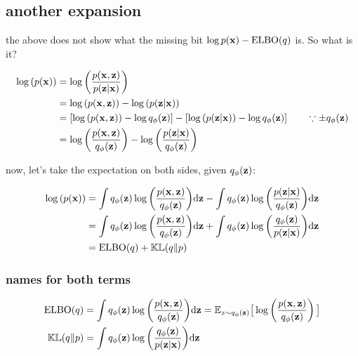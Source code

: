 \documentclass{article}
\begin{document}
\subsection{another expansion}

the above does not show what the missing bit $\log p({\mathbf x}) - \text{ELBO}(q)$ is. So what is it?

\begin{equation}\begin{split}
\log{(p({\mathbf x}))} &=  \log{  \left( \frac{p({\mathbf x},{\mathbf z})}{p({\mathbf z}|{\mathbf x})} \right)  } \\
&=  \log{ (p({\mathbf x},{\mathbf z})) } - \log{ (p({\mathbf z}|{\mathbf x})) }\\
&=  [ \log{ (p({\mathbf x},{\mathbf z})) } - \log q_\phi({\mathbf z})] - [ \log{ (p({\mathbf z}|{\mathbf x})) } - \log q_\phi({\mathbf z})] \quad\quad \because \pm q_\phi({\mathbf z})\\
&=  \log{  \left(   \frac{p({\mathbf x},{\mathbf z})}{q_\phi({\mathbf z})}  \right)  } -  \log{  \left(   \frac{p({\mathbf z}|{\mathbf x})}{q_\phi({\mathbf z})}  \right)  }\\
\end{split}\end{equation}


now, let's take the expectation on both sides, given $q_\phi({\mathbf z})$:



\begin{equation}\begin{split}
\log{(p({\mathbf x}))} &=   \int q_\phi({\mathbf z}) \log{  \left(   \frac{p({\mathbf x},{\mathbf z})}{q_\phi({\mathbf z})}  \right)  } \text{d} {\mathbf z} -  \int q_\phi({\mathbf z}) \log{  \left(   \frac{p({\mathbf z}|{\mathbf x})}{q_\phi({\mathbf z})}  \right)  } \text{d} {\mathbf z}\\
&=   \int q_\phi({\mathbf z}) \log{  \left(   \frac{p({\mathbf x},{\mathbf z})}{q_\phi({\mathbf z})}  \right)  } \text{d} {\mathbf z} + \int q_\phi({\mathbf z}) \log{  \left(   \frac{q_\phi({\mathbf z})}{p({\mathbf z}|{\mathbf x})}  \right)  } \text{d} {\mathbf z}\\
&= \text{ELBO}(q) + \mathbb{KL}(q\|p)
\end{split}\end{equation}



\subsubsection{names for both terms}

\begin{equation}\begin{split}
\text{ELBO}(q) &= \int q_\phi({\mathbf z}) \log{  \left(   \frac{p({\mathbf x},{\mathbf z})}{q_\phi({\mathbf z})}  \right)  } \text{d} {\mathbf z}
= \mathbb{E}_{z \sim q_\phi({\mathbf z}) } \big[ \log \left(   \frac{p({\mathbf x},{\mathbf z})}{q_\phi({\mathbf z})}  \right) \big]\\
\mathbb{KL}(q\|p) &= \int q_\phi({\mathbf z}) \log{  \left(   \frac{q_\phi({\mathbf z})}{p({\mathbf z}|{\mathbf x})}  \right)  } \text{d} {\mathbf z} 
\end{split}\end{equation}
\end{document}
